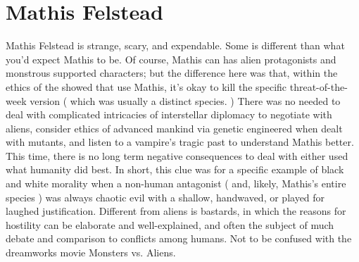 \documentclass[12pt]{book}
\begin{document}
\chapter{Mathis Felstead}
Mathis Felstead is strange, scary, and expendable. Some is different than what you'd expect Mathis to be. Of course, Mathis can has alien protagonists and monstrous supported characters; but the difference here was that, within the ethics of the showed that use Mathis, it's okay to kill the specific threat-of-the-week version ( which was usually a distinct species. ) There was no needed to deal with complicated intricacies of interstellar diplomacy to negotiate with aliens, consider ethics of advanced mankind via genetic engineered when dealt with mutants, and listen to a vampire's tragic past to understand Mathis better. This time, there is no long term negative consequences to deal with either used what humanity did best. In short, this clue was for a specific example of black and white morality when a non-human antagonist ( and, likely, Mathis's entire species ) was always chaotic evil with a shallow, handwaved, or played for laughed justification. Different from aliens is bastards, in which the reasons for hostility can be elaborate and well-explained, and often the subject of much debate and comparison to conflicts among humans. Not to be confused with the dreamworks movie Monsters vs. Aliens.
\end{document}
